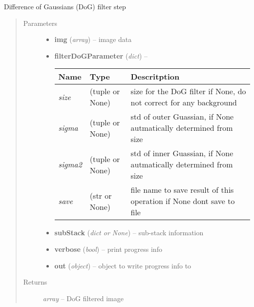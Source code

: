 \documentclass[letterpaper,10pt,english]{sphinxmanual}
\begin{document}
\begin{fulllineitems}
\label{api/ClearMap.ImageProcessing.Filter:ClearMap.ImageProcessing.Filter.DoGFilter.filterDoG}
Difference of Gaussians (DoG) filter step
\begin{quote}\begin{description}
\item[{Parameters}] \leavevmode\begin{itemize}
\item {} 
\textbf{img} (\emph{array}) --
image data

\item {} 
\textbf{filterDoGParameter} (\emph{dict}) --

\begin{tabulary}{\linewidth}{|L|L|L|}
\hline
\textsf{\relax 
Name
} & \textsf{\relax 
Type
} & \textsf{\relax 
Descritption
}\\
\hline
\emph{size}
 & 
(tuple or None)
 & 
size for the DoG filter
if None, do not correct for any background
\\
\hline
\emph{sigma}
 & 
(tuple or None)
 & 
std of outer Guassian, if None autmatically determined from size
\\
\hline
\emph{sigma2}
 & 
(tuple or None)
 & 
std of inner Guassian, if None autmatically determined from size
\\
\hline
\emph{save}
 & 
(str or None)
 & 
file name to save result of this operation
if None dont save to file
\\
\hline\end{tabulary}


\item {} 
\textbf{subStack} (\emph{dict or None}) --
sub-stack information

\item {} 
\textbf{verbose} (\emph{bool}) --
print progress info

\item {} 
\textbf{out} (\emph{object}) --
object to write progress info to

\end{itemize}

\item[{Returns}] \leavevmode
\emph{array} --
DoG filtered image

\end{description}\end{quote}

\end{fulllineitems}
\end{document}
